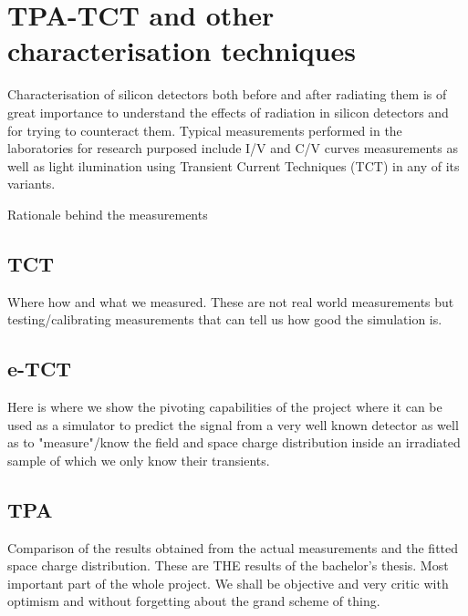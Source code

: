 \chapter{TPA-TCT and other characterisation techniques}

Characterisation of silicon detectors both before and after radiating them is of great importance to understand the effects of radiation in silicon detectors and for trying to counteract them. Typical measurements performed in the laboratories for research purposed include I/V and C/V curves measurements as well as light ilumination using Transient Current Techniques (TCT) in any of its variants. 

Rationale behind the measurements

\section{TCT} %
\label{sec:experimental_method}

Where how and what we measured. These are not real world measurements but testing/calibrating measurements that can tell us how good the simulation is. 


\section{e-TCT} %
\label{sec:fitting_method}

Here is where we show the pivoting capabilities of the project where it can be used as a simulator to predict the signal from a very well known detector as well as to "measure"/know the field and space charge distribution inside an irradiated sample of which we only know their transients.


\section{TPA} %
\label{sec:results_and_comparison_with_tracs_rad}

Comparison of the results obtained from the actual measurements and the fitted space charge distribution. These are THE results of the bachelor's thesis. Most important part of the whole  project. We shall be objective and very critic with optimism and without forgetting about the grand scheme of thing.


